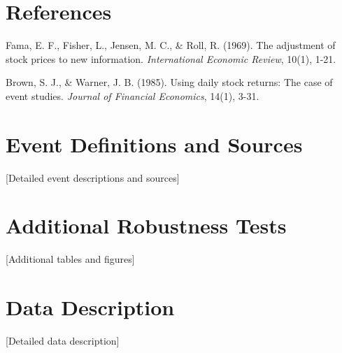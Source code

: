 \documentclass[12pt]{article}
\begin{document}

\newpage
\section*{References}

\begin{thebibliography}{99}

Fama, E. F., Fisher, L., Jensen, M. C., \& Roll, R. (1969).
The adjustment of stock prices to new information.
\textit{International Economic Review}, 10(1), 1-21.

Brown, S. J., \& Warner, J. B. (1985).
Using daily stock returns: The case of event studies.
\textit{Journal of Financial Economics}, 14(1), 3-31.


\end{thebibliography}


\newpage
\appendix

\section{Event Definitions and Sources}

[Detailed event descriptions and sources]

\section{Additional Robustness Tests}

[Additional tables and figures]

\section{Data Description}

[Detailed data description]

\end{document}

